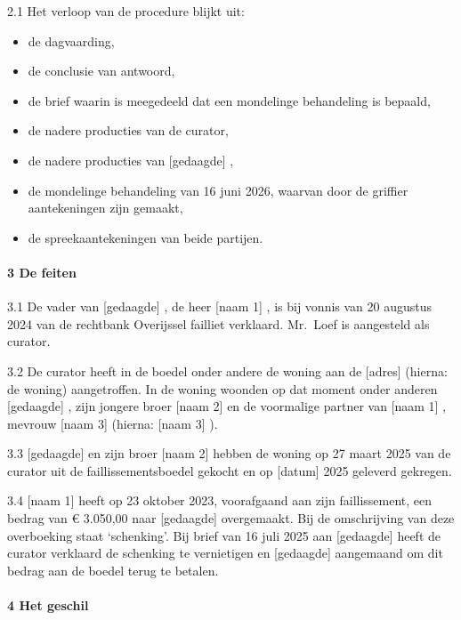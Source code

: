 \documentclass[
  dutch,
  a4paper,
]{article}
\begin{document}
2.1 Het verloop van de procedure blijkt uit:

\begin{itemize}
\item
  de dagvaarding,\\
\item
  de conclusie van antwoord,\\
\item
  de brief waarin is meegedeeld dat een mondelinge behandeling is bepaald,
\item
  de nadere producties van de curator,
\item
  de nadere producties van {[}gedaagde{]} ,
\item
  de mondelinge behandeling van 16 juni 2026, waarvan door de griffier aantekeningen zijn gemaakt,
\item
  de spreekaantekeningen van beide partijen.
\end{itemize}

\paragraph{3 De feiten}\label{de-feiten}

3.1 De vader van {[}gedaagde{]} , de heer {[}naam 1{]} , is bij vonnis van 20 augustus 2024 van de rechtbank Overijssel failliet verklaard. Mr.~Loef is aangesteld als curator.

3.2 De curator heeft in de boedel onder andere de woning aan de {[}adres{]} (hierna: de woning) aangetroffen. In de woning woonden op dat moment onder anderen {[}gedaagde{]} , zijn jongere broer {[}naam 2{]} en de voormalige partner van {[}naam 1{]} , mevrouw {[}naam 3{]} (hierna: {[}naam 3{]} ).

3.3 {[}gedaagde{]} en zijn broer {[}naam 2{]} hebben de woning op 27 maart 2025 van de curator uit de faillissementsboedel gekocht en op {[}datum{]} 2025 geleverd gekregen.

3.4 {[}naam 1{]} heeft op 23 oktober 2023, voorafgaand aan zijn faillissement, een bedrag van € 3.050,00 naar {[}gedaagde{]} overgemaakt. Bij de omschrijving van deze overboeking staat `schenking'. Bij brief van 16 juli 2025 aan {[}gedaagde{]} heeft de curator verklaard de schenking te vernietigen en {[}gedaagde{]} aangemaand om dit bedrag aan de boedel terug te betalen.

\paragraph{4 Het geschil}\label{het-geschil}
\end{document}
